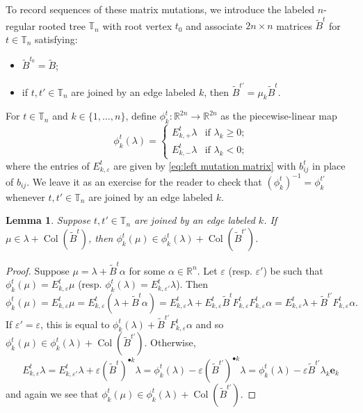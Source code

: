 \documentclass{amsart}
\newtheorem{lemma}[theorem]{Lemma}
\numberwithin{theorem}{section}
\newcommand{\RR}{\mathbb{R}}
\newcommand{\TT}{\mathbb{T}}
\newcommand{\Col}{\operatorname{Col}}
\begin{document}
  To record sequences of these matrix mutations, we introduce the labeled $n$-regular rooted tree $\TT_n$ with root vertex $t_0$ and associate $2n\times n$ matrices $\tilde{B}^t$ for $t\in\TT_n$ satisfying:
  \begin{itemize}
    \item $\tilde{B}^{t_0}=\tilde{B}$;
    \item if $t,t'\in\TT_n$ are joined by an edge labeled $k$, then $\tilde{B}^{t'}=\mu_k \tilde{B}^t$.
  \end{itemize}

  For $t\in\TT_n$ and $k\in\{1,\ldots,n\}$, define $\phi^t_k:\RR^{2n}\to\RR^{2n}$ as the piecewise-linear map
  \[\phi^t_k(\lambda)=\begin{cases} E^t_{k,+}\lambda & \text{if $\lambda_k\ge0$;}\\ E^t_{k,-}\lambda & \text{if $\lambda_k<0$;} \end{cases}\]
  where the entries of $E^t_{k,\varepsilon}$ are given by \eqref{eq:left mutation matrix} with $b^t_{ij}$ in place of $b_{ij}$.
  We leave it as an exercise for the reader to check that $(\phi^t_k)^{-1}=\phi^{t'}_k$ whenever $t,t'\in\TT_n$ are joined by an edge labeled $k$.
  \begin{lemma}
    Suppose $t,t'\in\TT_n$ are joined by an edge labeled $k$.
    If $\mu\in\lambda+\Col(\tilde{B}^t)$, then $\phi^t_k(\mu)\in\phi^t_k(\lambda)+\Col(\tilde{B}^{t'})$.
  \end{lemma}
  \begin{proof}
    Suppose $\mu=\lambda+\tilde{B}^t\alpha$ for some $\alpha\in\RR^n$.
    Let $\varepsilon$ (resp. $\varepsilon'$) be such that $\phi^t_k(\mu)=E^t_{k,\varepsilon}\mu$ (resp. $\phi^t_k(\lambda)=E^t_{k,\varepsilon'}\lambda$).
    Then 
    \[\phi^t_k(\mu)=E^t_{k,\varepsilon}\mu=E^t_{k,\varepsilon}(\lambda+\tilde{B}^t\alpha)=E^t_{k,\varepsilon}\lambda + E^t_{k,\varepsilon} \tilde{B}^t F^t_{k,\varepsilon} F^t_{k,\varepsilon}\alpha=E^t_{k,\varepsilon}\lambda + \tilde{B}^{t'} F^t_{k,\varepsilon}\alpha.\]
    If $\varepsilon'=\varepsilon$, this is equal to $\phi^t_k(\lambda) + \tilde{B}^{t'} F^t_{k,\varepsilon}\alpha$ and so $\phi^t_k(\mu)\in\phi^t_k(\lambda)+\Col(\tilde{B}^{t'})$.
    Otherwise, 
    \[E^t_{k,\varepsilon}\lambda=E^t_{k,\varepsilon'}\lambda+\varepsilon(\tilde{B}^t)^{\bullet k}\lambda=\phi^t_k(\lambda)-\varepsilon(\tilde{B}^{t'})^{\bullet k}\lambda=\phi^t_k(\lambda)-\varepsilon \tilde{B}^{t'} \lambda_k \mathbf{e}_k\]
    and again we see that $\phi^t_k(\mu)\in\phi^t_k(\lambda)+\Col(\tilde{B}^{t'})$.
  \end{proof}
\end{document}
